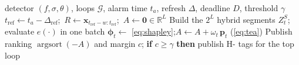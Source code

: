 \begin{algorithm}[t]
\caption{Deadline-aware localization for one incident}\label{alg:main}
\begin{algorithmic}[1]
\Require detector $(f,\sigma,\theta)$, loops $\mathcal G$, alarm time $t_a$, refresh $\Delta$, deadline $D$, threshold $\gamma$
\State $t_{\mathrm{ref}}\gets t_a-\Delta_{\mathrm{ref}}$;\ $R\gets\bm x_{t_{\mathrm{ref}}-w:t_{\mathrm{ref}}}$;\ $A\gets\bm 0\in\mathbb R^L$
  \State Build the $2^L$ hybrid segments $Z^S_t$; evaluate $e(\cdot)$ in one batch
  \State $\bm\phi_t\gets$ \cref{eq:shapley};\quad $A\gets A+\omega_t\,\bm p_t$ (\cref{eq:tea})
  \State Publish ranking $\operatorname{argsort}(-A)$ and margin $c$; \textbf{if} $c\ge\gamma$ \textbf{then} publish H-\LX{} tags for the top loop
\EndFor
\end{algorithmic}
\end{algorithm}

